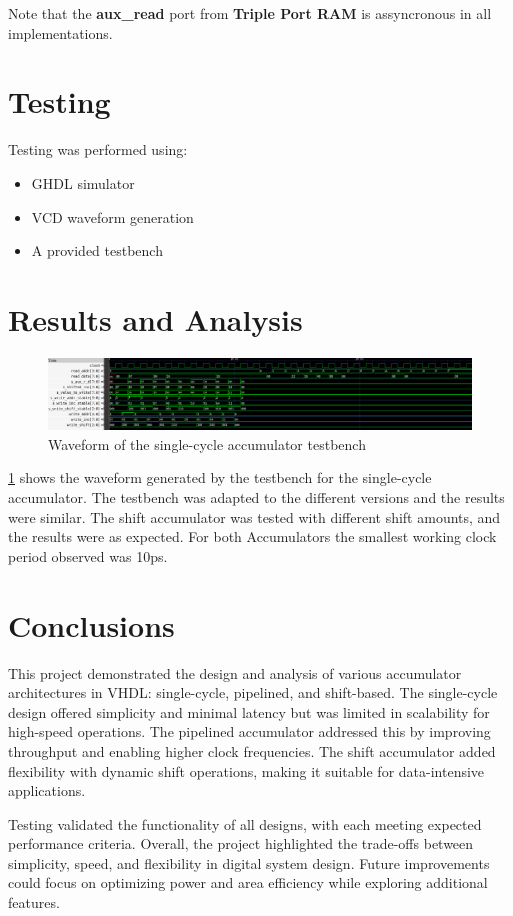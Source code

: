 \documentclass[a4paper,12pt]{article}
\begin{document}
Note that the \textbf{aux\_read} port from \textbf{Triple Port RAM} is assyncronous in all implementations.

\section{Testing}
Testing was performed using:
\begin{itemize}
    \item GHDL simulator
    \item VCD waveform generation
    \item A provided testbench  %
\end{itemize}

\section{Results and Analysis}
\begin{figure}[H]
    \centering
    \includegraphics[width=0.8\linewidth]{waveform.png}
    \caption{Waveform of the single-cycle accumulator testbench}
    \label{fig:waveform}
\end{figure}

\ref{fig:waveform} shows the waveform generated by the testbench for the single-cycle accumulator. The testbench was adapted to the different versions and the results were similar. The shift accumulator was tested with different shift amounts, and the results were as expected.
For both Accumulators the smallest working clock period observed was 10ps.

\section{Conclusions}
This project demonstrated the design and analysis of various accumulator architectures in VHDL: single-cycle, pipelined, and shift-based. The single-cycle design offered simplicity and minimal latency but was limited in scalability for high-speed operations. The pipelined accumulator addressed this by improving throughput and enabling higher clock frequencies. The shift accumulator added flexibility with dynamic shift operations, making it suitable for data-intensive applications.

Testing validated the functionality of all designs, with each meeting expected performance criteria. Overall, the project highlighted the trade-offs between simplicity, speed, and flexibility in digital system design. Future improvements could focus on optimizing power and area efficiency while exploring additional features.
\end{document}
